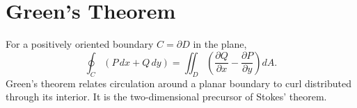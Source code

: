\section{Green's Theorem}
\label{sec:greens-theorem}
For a positively oriented boundary $C=\partial D$ in the plane,
\[
\oint_C (P\,dx+Q\,dy)=\iint_D\left(\frac{\partial Q}{\partial x}-\frac{\partial P}{\partial y}\right)dA.
\]
Green's theorem relates circulation around a planar boundary to curl distributed through its interior. It is the two-dimensional precursor of Stokes' theorem.
